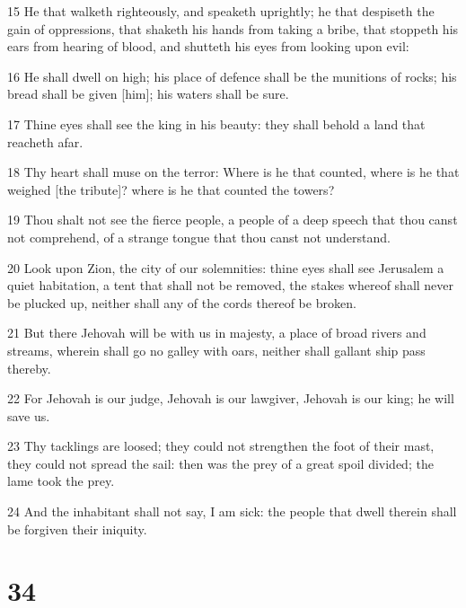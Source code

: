 \par 15 He that walketh righteously, and speaketh uprightly; he that despiseth the gain of oppressions, that shaketh his hands from taking a bribe, that stoppeth his ears from hearing of blood, and shutteth his eyes from looking upon evil:
\par 16 He shall dwell on high; his place of defence shall be the munitions of rocks; his bread shall be given [him]; his waters shall be sure.
\par 17 Thine eyes shall see the king in his beauty: they shall behold a land that reacheth afar.
\par 18 Thy heart shall muse on the terror: Where is he that counted, where is he that weighed [the tribute]? where is he that counted the towers?
\par 19 Thou shalt not see the fierce people, a people of a deep speech that thou canst not comprehend, of a strange tongue that thou canst not understand.
\par 20 Look upon Zion, the city of our solemnities: thine eyes shall see Jerusalem a quiet habitation, a tent that shall not be removed, the stakes whereof shall never be plucked up, neither shall any of the cords thereof be broken.
\par 21 But there Jehovah will be with us in majesty, a place of broad rivers and streams, wherein shall go no galley with oars, neither shall gallant ship pass thereby.
\par 22 For Jehovah is our judge, Jehovah is our lawgiver, Jehovah is our king; he will save us.
\par 23 Thy tacklings are loosed; they could not strengthen the foot of their mast, they could not spread the sail: then was the prey of a great spoil divided; the lame took the prey.
\par 24 And the inhabitant shall not say, I am sick: the people that dwell therein shall be forgiven their iniquity.

\chapter{34}

